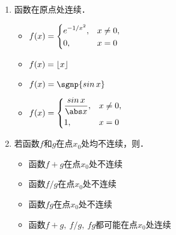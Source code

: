 \documentclass[a4paper,punct=CCT]{ctexbook}
\theoremstyle{definition}
\theoremstyle{remark}
\newif\ifshowsol
\begin{document}
\begin{enumerate}
\item 函数\uline{\makebox[10em]{}}在原点处连续．
  \begin{itemize}
    \renewcommand{\labelitemi}{\faCircleThin}
    \ifshowsol
  \item[\faCircle]
    \else
  \item
    \fi
    \begin{math}
      f(x) =
      \begin{dcases}
        e^{-1/x^2}, & x \ne 0, \\
        0, & x = 0
      \end{dcases}
    \end{math}
  \item \(f(x) = \lfloor x\rfloor\)
  \item \(f(x) = \sgnp{\sin x}\)
  \item
    \begin{math}
      f(x) =
      \begin{dcases}
        \frac{\sin x}{\abs x}, & x \ne 0, \\
        1, & x = 0
      \end{dcases}
    \end{math}\rule{0ex}{5ex}
  \end{itemize}

  \ifshowsol
  原点是选项~B、C、D中函数的跳跃间断点．选项~A中的函数在原点处的左右极限都是\(0\)且等于此处的函数值，因此连续．
  \fi

\item 若函数\(f\)和\(g\)在点\(x_0\)处均不连续，则\uline{\makebox[10em]{}}．
  \begin{itemize}
    \renewcommand{\labelitemi}{\faCircleThin}
  \item 函数\(f+g\)在点\(x_0\)处不连续
  \item 函数\(f/g\)在点\(x_0\)处不连续
  \item 函数\(fg\)在点\(x_0\)处不连续
    \ifshowsol
  \item[\faCircle]
    \else
  \item
    \fi
    函数\(f+g,\ f/g,\ fg\)都可能在点\(x_0\)处连续
  \end{itemize}

  \ifshowsol
  令\(f(x) = \Fn H(x),\ g(x) = 1-\Fn H(x)\)，则\(f + g = 1,\ fg = 0\)，因此选项~A和~C不正确．令
  \begin{equation*}
    f(x) = g(x) = \frac{1}{x \Fn H(x) + \Fn H(-x)},
  \end{equation*}
  则\(f/g = 1\)，因此选项~B不正确．
  \fi
\end{enumerate}
\fi
\end{document}
